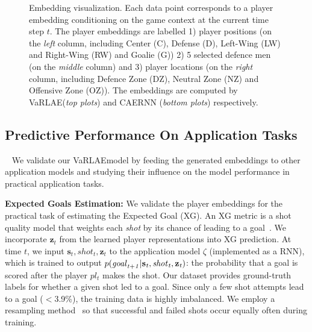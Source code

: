 \documentclass{article}
\newcommand{\latentvariables}{\mathbf{z}}
\newcommand{\state}{\mathbf{s}}
\newcommand{\player}{pl}
\newcommand{\system}{VaRLAE\;}
\begin{document}
\begin{figure}[!htbp]
    \caption{Embedding visualization. Each data point corresponds to a player embedding conditioning on the game context at the current %
    time step $t$.  
    The player embeddings are labelled 1) player positions (on the {\it left} column, including Center (C), Defense (D), Left-Wing (LW) and Right-Wing (RW) and Goalie (G)) 2) 5 selected defence men (on the {\it middle} column) and 3) player locations (on the {\it right} column, including Defence Zone (DZ), Neutral Zone (NZ) and Offensive Zone (OZ)). The embeddings are computed by \system ({\it top plots}) and CAERNN ({\it bottom plots}) respectively.} 
    \label{fig:embedding-visualization}%
\end{figure}

\subsection{Predictive Performance On Application Tasks}
~\label{subsec:downstream-applications}
We validate our \system model by feeding the generated embeddings to other application models and studying their influence on the model performance in practical application tasks.

{\bf Expected Goals Estimation:} We validate the player embeddings for the practical 
task of estimating the Expected Goal (XG). 
An XG metric is a shot quality model that weights each {\it shot} by its chance of leading to a goal~\cite{Macdonald2012}.
We incorporate $\latentvariables_{t}$ from the learned player representations into XG prediction. 
At time $t$, we input $\state_{t},shot_{t},\latentvariables_{t}$ to the application model $\zeta$ (implemented as a RNN), which is trained to output $p(\it{goal}_{t+1}|\state_{t},\it{shot}_t,\latentvariables_{t})$: the probability that a goal is scored after the player $\player_{t}$ makes the shot.
Our dataset provides ground-truth labels for whether a given shot led to a goal. 
Since only a few shot attempts lead to a goal ($<$3.9\%), the training data is highly imbalanced.
We %
employ a resampling method~\cite{good2006resampling} so that successful and failed shots %
 occur equally often during training.
\end{document}

